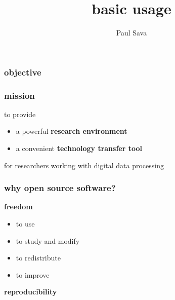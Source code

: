 


\title[]{basic \mg usage}
\author[]{Paul Sava}
\date{}
\logo{}
\large

 { \cwpcover }

\begin{frame} \frametitle{objective}
\end{frame}
\cwpnote{}

\begin{frame} \frametitle{\mg mission}

  to provide
  \vfill
  \begin{itemize}
  \item a powerful \textbf{research environment} \\
    \vfill
  \item a convenient \textbf{technology transfer tool} \\
    \vfill
  \end{itemize}
  for researchers working with digital data processing
  
\end{frame}
\cwpnote{}

\begin{frame} \frametitle{why open source software?}

  \textbf{freedom}
  \begin{itemize}
  \item to use 
  \item to study and modify 
  \item to redistribute 
  \item to improve
  \end{itemize}
  
  \vfill
  \textbf{reproducibility}
  \vfill
  
\end{frame}
\cwpnote{}

